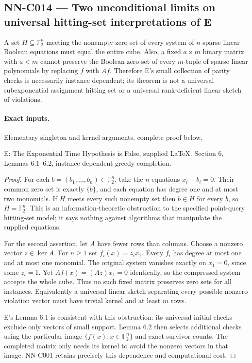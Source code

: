 \subsection{NN-C014 --- Two unconditional limits on universal hitting-set interpretations of E}
\begin{proposition}[NN-C014]
A set $H\subseteq\mathbb F_2^n$ meeting the nonempty zero set of every system of $n$ sparse linear Boolean equations must equal the entire cube. Also, a fixed $a\times m$ binary matrix with $a<m$ cannot preserve the Boolean zero set of every $m$-tuple of sparse linear polynomials by replacing $f$ with $Af$. Therefore E's small collection of parity checks is necessarily instance dependent; its theorem is not a universal subexponential assignment hitting set or a universal rank-deficient linear sketch of violations.
\end{proposition}
\paragraph{Exact inputs.}
Elementary singleton and kernel arguments. complete proof below.

E: The Exponential Time Hypothesis is False, supplied LaTeX. Section 6, Lemmas 6.1--6.2, instance-dependent greedy completion.

\begin{proof}
For each $b=(b_1,\ldots,b_n)\in\mathbb F_2^n$, take the $n$ equations $x_i+b_i=0$. Their common zero set is exactly $\{b\}$, and each equation has degree one and at most two monomials. If $H$ meets every such nonempty set then $b\in H$ for every $b$, so $H=\mathbb F_2^n$. This is an information-theoretic obstruction to the specified point-query hitting-set model; it says nothing against algorithms that manipulate the supplied equations.

For the second assertion, let $A$ have fewer rows than columns. Choose a nonzero vector $z\in\ker A$. For $n\geq1$ set $f_i(x)=z_i x_1$. Every $f_i$ has degree at most one and at most one monomial. The original system vanishes exactly on $x_1=0$, since some $z_i=1$. Yet $Af(x)=(Az)x_1=0$ identically, so the compressed system accepts the whole cube. Thus no such fixed matrix preserves zero sets for all instances. Equivalently a universal linear sketch separating every possible nonzero violation vector must have trivial kernel and at least $m$ rows.

E's Lemma 6.1 is consistent with this obstruction: its universal initial checks exclude only vectors of small support. Lemma 6.2 then selects additional checks using the particular image $\{f(x):x\in\mathbb F_2^n\}$ and exact survivor counts. The completed matrix only needs its kernel to avoid the nonzero vectors in that image. NN-C001 retains precisely this dependence and computational cost.
\end{proof}
